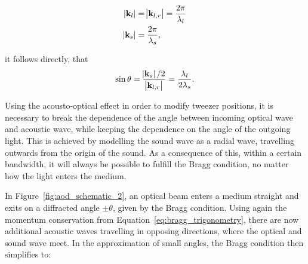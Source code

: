 \begin{align}
	\abs{\mathbf{k}_l} &= \abs{\mathbf{k}_{l,r}} = \frac{2\pi}{\lambda_l} \\
	\abs{\mathbf{k}_s} &= \frac{2\pi}{\lambda_s},
\end{align}

it follows directly, that
\begin{align}
	\label{eq:bragg_trigonometry}
	\sin{\theta} = \frac{\abs{\mathbf{k}_s} / 2}{\abs{\mathbf{k}_{l,r}}} = \frac{\lambda_l}{2\lambda_s}.
\end{align}

\begin{figure}[tbp]
\end{figure}



Using the acousto-optical effect in order to modify tweezer positions, it is necessary to break the dependence of the angle between incoming optical wave and acoustic wave, while keeping the dependence on the angle of the outgoing light. This is achieved by modelling the sound wave as a radial wave, travelling outwards from the origin of the sound. As a consequence of this, within a certain bandwidth, it will always be possible to fulfill the Bragg condition, no matter how the light enters the medium.

In Figure~\ref{fig:aod_schematic_2}, an optical beam enters a medium straight and exits on a diffracted angle $\pm \theta$, given by the Bragg condition. Using again the momentum conservation from Equation~\ref{eq:bragg_trigonometry}, there are now additional acoustic waves travelling in opposing directions, where the optical and sound wave meet. In the approximation of small angles, the Bragg condition then simplifies to:

